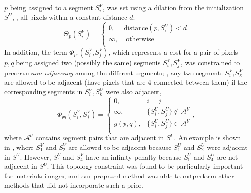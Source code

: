 \documentclass[]{spie}  %
\begin{document}
$p$ being assigned to a segment $S^V_i$, was set using a dilation from
the initialization $S^U$, \ie, all pixels within a constant distance
$d$:
\begin{equation}
  \Theta_p(S^{V}_i) = \left\{
    \begin{array}{lcr}
      0, &  \textrm{distance}(p,S^U_i) < d  \\
      \infty, & \textrm{ otherwise} \\
    \end{array}
  \right.
  \label{eq:theta}
\end{equation}
In addition, the \smooth{} term $\Phi_{pq}(S_i^V , S_j^V)$, which
represents a cost for a pair of pixels $p,q$ being assigned two
(possibly the same) segments $S^V_i, S^V_j$, was constrained to
preserve \emph{non-adjacency} among the different segments; \ie, any
two segments $S^V_i, S^V_k$ are allowed to be adjacent (have pixels
that are 4-connected between them) if the corresponding segments in
$S^U_i, S^U_k$ were also adjacent,
\begin{equation} \Phi_{pq}(S^V_i , S^V_j) = \left\{
    \begin{array}{lcr}
      0, & i = j \\
      \infty, & \{ S^U_i, S^U_j \} \notin \mathcal{A}^U  \\
      g( p, q ), & \{ S^U_i, S^U_j \} \in \mathcal{A}^U \\
    \end{array}
  \right. ,
  \label{eq:phi}
\end{equation}
where $\mathcal{A}^U$ contains segment pairs that are adjacent in
$S^U$.  An example is shown in , where $S^V_1$ and $S^V_2$
are allowed to be adjacent because $S^U_1$ and $S^U_2$ were adjacent
in $S^U$.  However, $S^V_1$ and $S^V_4$ have an infinity penalty
because $S^U_1$ and $S^U_4$ are not adjacent in $S^U$.  This topology
constraint was found to be particularly important for materials
images, and our proposed method was able to outperform other methods
that did not incorporate such a prior.
\end{document}
